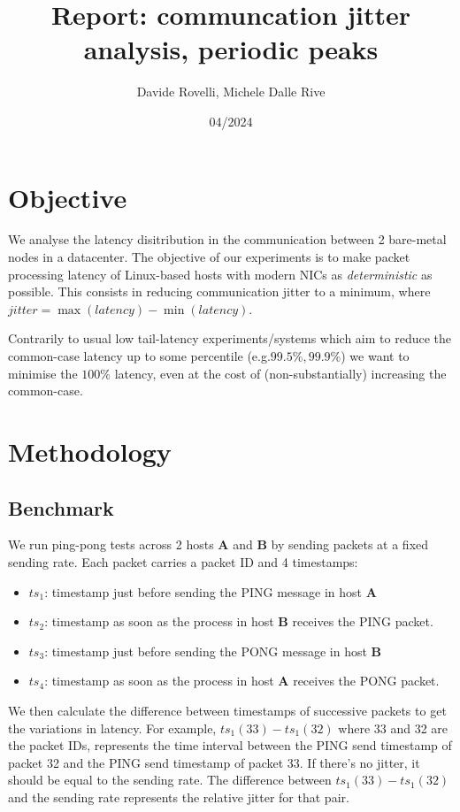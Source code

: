 \documentclass{article}
\begin{document}
\date{04/2024}

\title{\Large \bf Report: communcation jitter analysis, periodic peaks}

\author{Davide Rovelli, Michele Dalle Rive}
\maketitle

\section*{Objective}
We analyse the latency disitribution in the communication between 2 bare-metal 
nodes in a datacenter. The objective of our experiments is to make packet 
processing latency of Linux-based hosts with modern NICs as \textit{deterministic}
as possible. This consists in reducing communication jitter to a minimum, where
$jitter = \max(latency) - \min(latency)$.

Contrarily to usual low tail-latency experiments/systems which aim to reduce the
common-case latency up to some percentile (e.g.$99.5\%, 99.9\%$) we want to minimise 
the $100\%$ latency, even at the cost of (non-substantially) increasing the 
common-case. 

\section*{Methodology}

\subsection*{Benchmark}
We run ping-pong tests across 2 hosts \textbf{A} and \textbf{B} by sending packets
at a fixed sending rate. Each packet carries a packet ID and 4 timestamps:

\begin{itemize}
  \itemsep=-0.8mm
  \item $ts_1$: timestamp just before sending the PING message in host \textbf{A}
  \item $ts_2$: timestamp as soon as the process in host \textbf{B} receives the
  PING packet.
  \item $ts_3$: timestamp just before sending the PONG message in host \textbf{B}
  \item $ts_4$: timestamp as soon as the process in host \textbf{A} receives the
  PONG packet.
\end{itemize}

We then calculate the difference between timestamps of successive packets
to get the variations in latency. For example, $ts_1(33) - ts_1(32)$ where 33 and
32 are the packet IDs, represents the time interval between the PING send timestamp
of packet 32 and the PING send timestamp of packet 33. If there's no jitter,
it should be equal to the sending rate. The difference between $ts_1(33) - ts_1(32)$
and the sending rate represents the relative jitter for that pair. 
\end{document}
